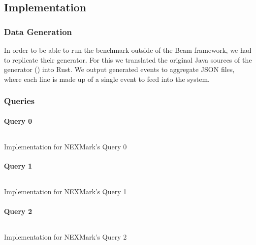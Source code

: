 
\subsection{Implementation}
\subsubsection{Data Generation}
In order to be able to run the benchmark outside of the Beam framework, we had to replicate their generator. For this we translated the original Java sources of the generator () into Rust. We output generated events to aggregate JSON files, where each line is made up of a single event to feed into the system. \\

\subsubsection{Queries}
\paragraph{Query 0}
\begin{listing}[H]
  \inputminted[firstline=404,lastline=404]{rust}{benchmarks/src/nexmark.rs}
  \caption{Implementation for NEXMark's Query 0}
  \label{lst:nexmark-query0}
\end{listing}

\paragraph{Query 1}
\begin{listing}[H]
  \inputminted[firstline=424,lastline=426]{rust}{benchmarks/src/nexmark.rs}
  \caption{Implementation for NEXMark's Query 1}
  \label{lst:nexmark-query1}
\end{listing}

\paragraph{Query 2}
\begin{listing}[H]
  \inputminted[firstline=447,lastline=450]{rust}{benchmarks/src/nexmark.rs}
  \caption{Implementation for NEXMark's Query 2}
  \label{lst:nexmark-query2}
\end{listing}

